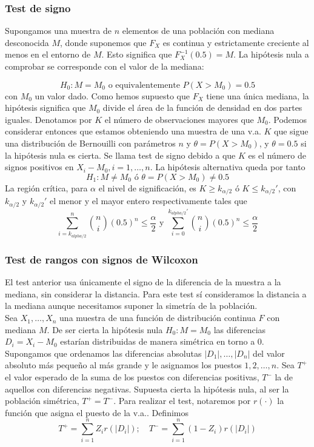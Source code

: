 \subsubsection{Test de signo}

	Supongamos una muestra de $n$ elementos de una población 
con mediana desconocida $M$, donde suponemos que $F_X$ 
es continua y estrictamente creciente al menos en el entorno 
de $M$. Esto significa que $F_X^{-1}(0.5) = M$. La hipótesis 
nula a comprobar se corresponde con el valor de la mediana:

	\[ H_0: M = M_0	\text{ o equivalentemente }
			P(X > M_0) = 0.5 \]
	con $M_0$ un valor dado. Como hemos supuesto que $F_X$ 
tiene una única mediana, la hipótesis significa que $M_0$ 
divide el área de la función de densidad en dos partes 
iguales. Denotamos por $K$ el número de observaciones mayores 
que $M_0$. Podemos considerar entonces que estamos obteniendo 
una muestra de una v.a. $K$ que sigue una distribución de 
Bernouilli con parámetros $n$ y $\theta=P(X>M_0)$, y 
$\theta=0.5$ si la hipótesis nula es cierta. Se llama test de 
signo debido a que $K$ es el número de signos positivos en 
$X_i - M_0, i = 1, \dots, n$. La hipótesis alternativa queda 
por tanto
	\[ H_1: M \neq M_0	\text{ ó }
			\theta = P(X > M_0) \neq 0.5 \]
	La región crítica, para $\alpha$ el nivel de 
significación, es $K \geq k_{\alpha/2}$ ó $K \leq 
k_{\alpha/2}'$, con $k_{\alpha/2}$ y $k_{\alpha/2}'$ el menor 
y el mayor entero respectivamente tales que
	\[ \sum\limits_{i=k_{alpha/2}}^n
			{n \choose i}(0.5)^n \leq \frac{\alpha}{2}
		\text{ y }
		\sum\limits_{i=0}^{k_{alpha/2}'}
			{n \choose i}(0.5)^n \leq \frac{\alpha}{2}
	\]

\subsubsection{Test de rangos con signos de Wilcoxon}

	El test anterior usa únicamente el signo de la diferencia 
de la muestra a la mediana, sin considerar la distancia. Para 
este test sí consideramos la distancia a la mediana aunque 
necesitamos suponer la simetría de la población. \\
	Sea $X_1, \dots, X_n$ una muestra de una función de 
distribución continua $F$ con mediana $M$. De ser cierta la 
hipótesis nula $H_0: M = M_0$ las diferencias $D_i = X_i - 
M_0$ estarían distribuidas de manera simétrica en torno 
a 0.\\
	Supongamos que ordenamos las diferencias absolutas 
$|D_1|, \dots, |D_n|$ del valor absoluto más pequeño al más 
grande y le asignamos los puestos $1, 2, \dots, n$. Sea $T^+$ 
el valor esperado de la suma de los puestos con diferencias 
positivas, $T^-$ la de aquellos con diferencias negativas. 
Supuesta cierta la hipótesis nula, al ser la población 
simétrica, $T^+ = T^-$. Para realizar el test, notaremos por
$r(\cdot)$ la función que asigna el puesto de la v.a.. 
Definimos
	\[ T^+ = \sum\limits_{i=1}^n Z_i r(|D_i|); \quad
	   T^- = \sum\limits_{i=1}^n (1-Z_i) r(|D_i|) \]
	   
